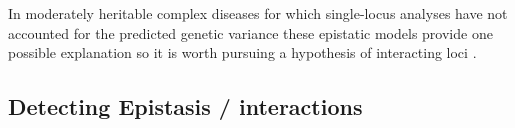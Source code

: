 In moderately heritable complex diseases for which single-locus analyses have not accounted for the predicted genetic variance these epistatic models provide one possible explanation so it is worth pursuing a hypothesis of interacting loci \cite{culverhouse2002perspective}.




\subsection{Detecting Epistasis / interactions}

